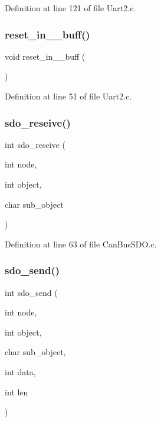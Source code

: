 Definition at line 121 of file Uart2.\+c.

\mbox{\label{befehl_8c_a11017698f1db31d98f1115d4b4463d02}} 
\subsubsection{reset\+\_\+in\+\_\+\_\+buff()}
{\footnotesize\ttfamily void reset\+\_\+in\+\_\+\_\+buff (\begin{DoxyParamCaption}{ }\end{DoxyParamCaption})}



Definition at line 51 of file Uart2.\+c.

\mbox{\label{befehl_8c_a6b768675f6e34d26d3ee6628c86e1c65}} 
\subsubsection{sdo\+\_\+reseive()}
{\footnotesize\ttfamily int sdo\+\_\+reseive (\begin{DoxyParamCaption}\item[{int}]{node,  }\item[{int}]{object,  }\item[{char}]{sub\+\_\+object }\end{DoxyParamCaption})}



Definition at line 63 of file Can\+Bus\+S\+D\+O.\+c.

\mbox{\label{befehl_8c_aacd31538a9d41269e68e6cec5b1ba3de}} 
\subsubsection{sdo\+\_\+send()}
{\footnotesize\ttfamily int sdo\+\_\+send (\begin{DoxyParamCaption}\item[{int}]{node,  }\item[{int}]{object,  }\item[{char}]{sub\+\_\+object,  }\item[{int}]{data,  }\item[{int}]{len }\end{DoxyParamCaption})}

